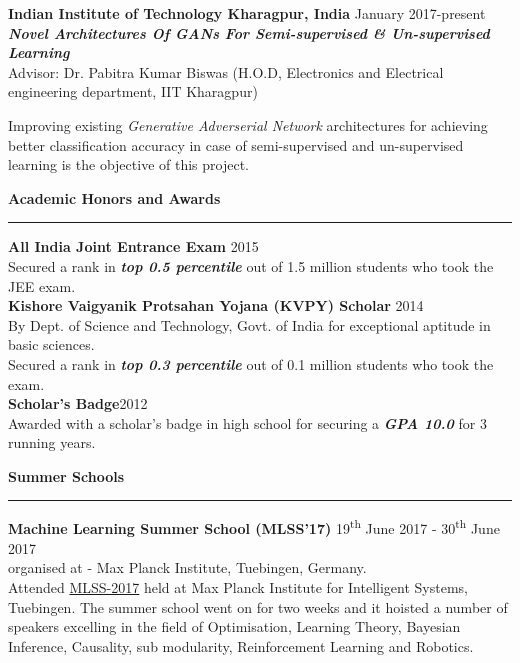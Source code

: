 \documentclass[10pt]{article}
\newcommand{\heading}[1]{
 {\large \textbf{#1}}
  \vspace{0.4em}
  \hrule
  \vspace{0.4em}
}
\newcommand{\EntryGap}{\vspace{0.4  cm}}
\newcommand{\SmallEntryGap}{\vspace{0.2cm}}
\newcommand{\indentedpar}[1]{
  \hangindent=1cm \hangafter=0 #1
}
\begin{document}
\SmallEntryGap


\textbf{Indian Institute of Technology Kharagpur, India} \hfill January 2017-present\\
\textbf{\emph{Novel Architectures Of GANs For Semi-supervised \& Un-supervised Learning}}\\
Advisor: Dr. Pabitra Kumar Biswas (H.O.D, Electronics and Electrical engineering department, IIT Kharagpur)

\SmallEntryGap

\indentedpar{
Improving existing \emph{Generative Adverserial Network} architectures for achieving better classification accuracy in case of semi-supervised and un-supervised learning is the objective of this project.
}



\EntryGap
\heading{Academic Honors and Awards}

 \textbf{All India Joint Entrance Exam} \hfill 2015\\
  Secured a rank in \textbf{\emph{top 0.5 percentile}} out of 1.5 million students who took the JEE exam.\\
  
 \textbf{Kishore Vaigyanik Protsahan Yojana (KVPY) Scholar} \hfill 2014\\
  By Dept. of Science and Technology, Govt. of India for exceptional aptitude in basic sciences.\\
  Secured a rank in \textbf{\emph{top 0.3 percentile}} out of 0.1 million students who took the exam.\\
  
 \textbf{Scholar's Badge}\hfill 2012\\
     Awarded with a scholar's badge in high school for securing a \textbf{\emph{GPA 10.0}} for 3 running years.



\EntryGap
\heading{Summer Schools}
\textbf{Machine Learning Summer School (MLSS'17)} \hfill 19\textsuperscript{th} June 2017 - 30\textsuperscript{th} June 2017\\
organised at - Max Planck Institute, Tuebingen, Germany.\\
Attended \href{http://mlss.tuebingen.mpg.de/}{MLSS-2017} held at Max Planck Institute for Intelligent Systems,
Tuebingen. The summer school went on for two weeks and it hoisted a number of speakers
excelling in the field of Optimisation, Learning Theory, Bayesian Inference, Causality, sub modularity, Reinforcement
Learning and Robotics.  
\end{document}
